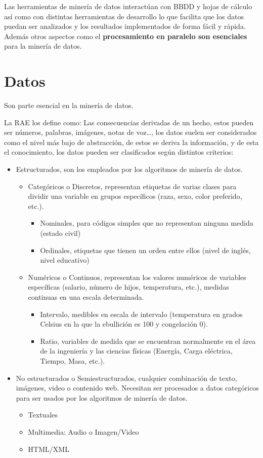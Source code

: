 \documentclass[12pt, twoside, openright]{report} %
\begin{document}
Las herramientas de minería de datos interactúan con BBDD y hojas de cálculo así como con distintas herramientas de desarrollo lo que facilita que los datos puedan ser analizados y los resultados implementados de forma fácil y rápida. Además otros aspectos como el \textbf{procesamiento en paralelo son esenciales} para la minería de datos.

\section{Datos}
Son parte esencial en la minería de datos.

La RAE los define como: Las consecuencias derivadas de un hecho, estos pueden ser números, palabras, imágenes, notas de voz…, los datos suelen ser considerados como el nivel más bajo de abstracción, de estos se deriva la información, y de esta el conocimiento, los datos pueden ser clasificados según distintos criterios:
\begin{itemize}
	\item Estructurados, son los empleados por los algoritmos de minería de datos.
	      \begin{itemize}
		      \item Categóricos o Discretos, representan etiquetas de varias clases para dividir una variable en grupos específicos (raza, sexo, color preferido, etc.).
		            \begin{itemize}
			            \item Nominales, para códigos simples que no representan ninguna medida (estado civil)
			            \item Ordinales, etiquetas que tienen un orden entre ellos (nivel de inglés, nivel educativo)
		            \end{itemize}
		      \item Numéricos o Continuos, representan los valores numéricos de variables específicas (salario, número de hijos, temperatura, etc.), medidas continuas en una escala determinada.
		            \begin{itemize}
			            \item Intervalo, medibles en escala de intervalo (temperatura en grados Celsius en la que la ebullición es 100 y congelación 0).
			            \item Ratio, variables de medida que se encuentran normalmente en el área de la ingeniería y las ciencias físicas (Energía, Carga eléctrica, Tiempo, Masa, etc.).
		            \end{itemize}
	      \end{itemize}
	\item No estructurados o Semiestructurados, cualquier combinación de texto, imágenes, video o contenido web. Necesitan ser procesados a datos categóricos para ser usados por los algoritmos de minería de datos.
	      \begin{itemize}
		      \item Textuales
		      \item Multimedia: Audio o Imagen/Video
		      \item HTML/XML
	      \end{itemize}
\end{itemize}
\end{document}
